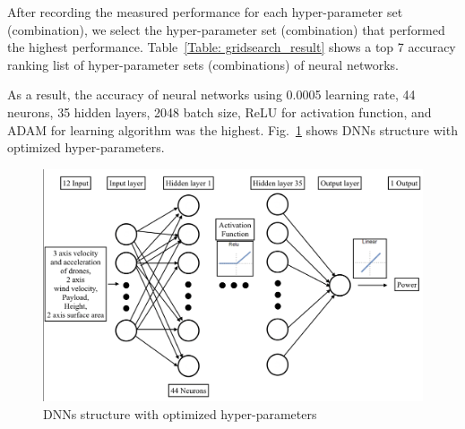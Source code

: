 \documentclass[journal]{./template/IEEEtran}
\begin{document}
After recording the measured performance for each hyper-parameter set (combination), we select the hyper-parameter set (combination) that performed the highest performance. 
Table~\ref{Table: gridsearch_result} shows a top 7 accuracy ranking list of hyper-parameter sets (combinations) of neural networks.

\begin{table}[ht]
\caption{The list of grid search results}
\label{Table: gridsearch_result}
\end{table}

As a result, the accuracy of neural networks using 0.0005 learning rate, 44 neurons, 35 hidden layers, 2048 batch size, ReLU for activation function, and ADAM for learning algorithm was the highest. Fig.~\ref{fig:DNN_structure} shows DNNs structure with optimized hyper-parameters.

\begin{figure}[htbp]
\centering\includegraphics[scale=0.25]{fig6/NN_structure.pdf}
\caption{DNNs structure with optimized hyper-parameters}
\label{fig:DNN_structure}
\end{figure}
\end{document}
